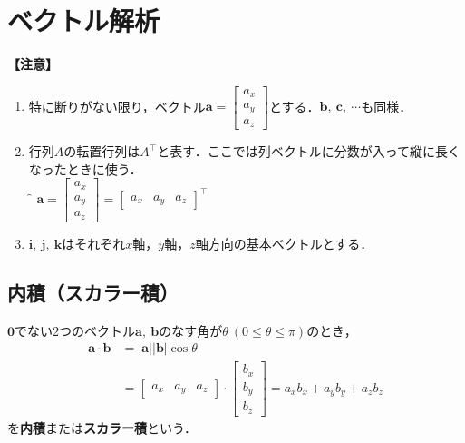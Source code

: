 \chapter{ベクトル解析}
\setcounter{page}{1}

\noindent
\textbf{【注意】}
\begin{enumerate}[leftmargin=15pt]
	\item 特に断りがない限り，ベクトル$\bm{a} =
			\begin{bmatrix}
				a_x\\ a_y\\ a_z
			\end{bmatrix}
			$とする．$\bm{b},\ \bm{c},\ \cdots$も同様．
	\item 行列$A$の転置行列は$A^\top$と表す．ここでは列ベクトルに分数が入って縦に長くなったときに使う．\\
	\f{例} $\bm{a} =
	\begin{bmatrix}
		a_x\\ a_y\\ a_z
	\end{bmatrix}
	=
	{
		\begin{bmatrix}
			a_x & a_y & a_z
		\end{bmatrix}
	}^\top
	$
	\item $\bm{i},\ \bm{j},\ \bm{k}$はそれぞれ$x$軸，$y$軸，$z$軸方向の基本ベクトルとする．
\end{enumerate}



\section{内積（スカラー積）}

$\bm{0}$でない2つのベクトル$\bm{a},\ \bm{b}$のなす角が$\theta\ (0 \le \theta \le \pi)$のとき，
\begin{align}
	\bm{a} \cdot \bm{b} &= |\bm{a}||\bm{b}|\cos\theta\\
						&=
						\begin{bmatrix}
							a_x & a_y & a_z
						\end{bmatrix}
						\cdot
						\begin{bmatrix}
							b_x\\ b_y \\ b_z
						\end{bmatrix}
						= a_x b_x + a_y b_y + a_z b_z
\end{align}
を\textbf{内積}または\textbf{スカラー積}という．

